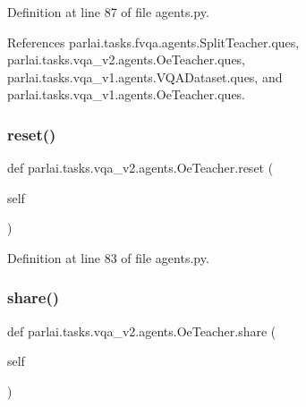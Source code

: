 Definition at line 87 of file agents.\+py.



References parlai.\+tasks.\+fvqa.\+agents.\+Split\+Teacher.\+ques, parlai.\+tasks.\+vqa\+\_\+v2.\+agents.\+Oe\+Teacher.\+ques, parlai.\+tasks.\+vqa\+\_\+v1.\+agents.\+V\+Q\+A\+Dataset.\+ques, and parlai.\+tasks.\+vqa\+\_\+v1.\+agents.\+Oe\+Teacher.\+ques.

\mbox{\label{classparlai_1_1tasks_1_1vqa__v2_1_1agents_1_1OeTeacher_aa20e871a24dbb851310b357a58ed4b84}} 
\subsubsection{\texorpdfstring{reset()}{reset()}}
{\footnotesize\ttfamily def parlai.\+tasks.\+vqa\+\_\+v2.\+agents.\+Oe\+Teacher.\+reset (\begin{DoxyParamCaption}\item[{}]{self }\end{DoxyParamCaption})}



Definition at line 83 of file agents.\+py.

\mbox{\label{classparlai_1_1tasks_1_1vqa__v2_1_1agents_1_1OeTeacher_a578dc1b9b99fa81231ccb16975013228}} 
\subsubsection{\texorpdfstring{share()}{share()}}
{\footnotesize\ttfamily def parlai.\+tasks.\+vqa\+\_\+v2.\+agents.\+Oe\+Teacher.\+share (\begin{DoxyParamCaption}\item[{}]{self }\end{DoxyParamCaption})}



